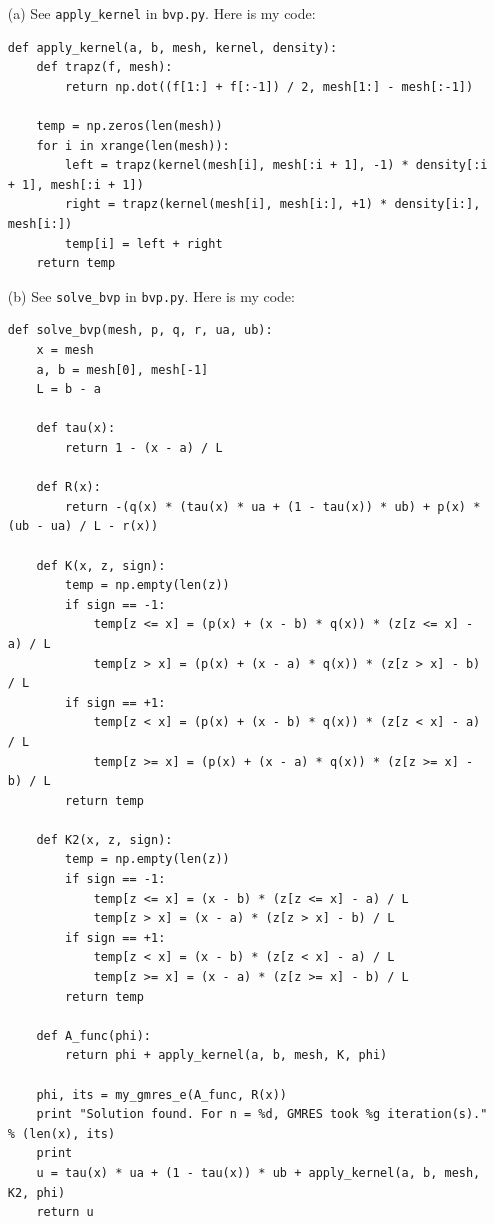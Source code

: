 \documentclass[10pt]{article}
\begin{document}
\begin{itemize}

\item[(a)] See \verb+apply_kernel+ in \verb+bvp.py+. Here is my code:
\begin{lstlisting}
def apply_kernel(a, b, mesh, kernel, density):
    def trapz(f, mesh):
        return np.dot((f[1:] + f[:-1]) / 2, mesh[1:] - mesh[:-1])

    temp = np.zeros(len(mesh))
    for i in xrange(len(mesh)):
        left = trapz(kernel(mesh[i], mesh[:i + 1], -1) * density[:i + 1], mesh[:i + 1])
        right = trapz(kernel(mesh[i], mesh[i:], +1) * density[i:], mesh[i:])
        temp[i] = left + right
    return temp
\end{lstlisting}

\item[(b)] See \verb+solve_bvp+ in \verb+bvp.py+. Here is my code: \begin{lstlisting}
def solve_bvp(mesh, p, q, r, ua, ub):
    x = mesh
    a, b = mesh[0], mesh[-1]
    L = b - a

    def tau(x):
        return 1 - (x - a) / L

    def R(x):
        return -(q(x) * (tau(x) * ua + (1 - tau(x)) * ub) + p(x) * (ub - ua) / L - r(x))

    def K(x, z, sign):
        temp = np.empty(len(z))
        if sign == -1:
            temp[z <= x] = (p(x) + (x - b) * q(x)) * (z[z <= x] - a) / L
            temp[z > x] = (p(x) + (x - a) * q(x)) * (z[z > x] - b) / L
        if sign == +1:
            temp[z < x] = (p(x) + (x - b) * q(x)) * (z[z < x] - a) / L
            temp[z >= x] = (p(x) + (x - a) * q(x)) * (z[z >= x] - b) / L
        return temp

    def K2(x, z, sign):
        temp = np.empty(len(z))
        if sign == -1:
            temp[z <= x] = (x - b) * (z[z <= x] - a) / L
            temp[z > x] = (x - a) * (z[z > x] - b) / L
        if sign == +1:
            temp[z < x] = (x - b) * (z[z < x] - a) / L
            temp[z >= x] = (x - a) * (z[z >= x] - b) / L
        return temp

    def A_func(phi):
        return phi + apply_kernel(a, b, mesh, K, phi)

    phi, its = my_gmres_e(A_func, R(x))
    print "Solution found. For n = %d, GMRES took %g iteration(s)." % (len(x), its)
    print
    u = tau(x) * ua + (1 - tau(x)) * ub + apply_kernel(a, b, mesh, K2, phi)
    return u

\end{lstlisting}


\end{itemize}
\end{document}
